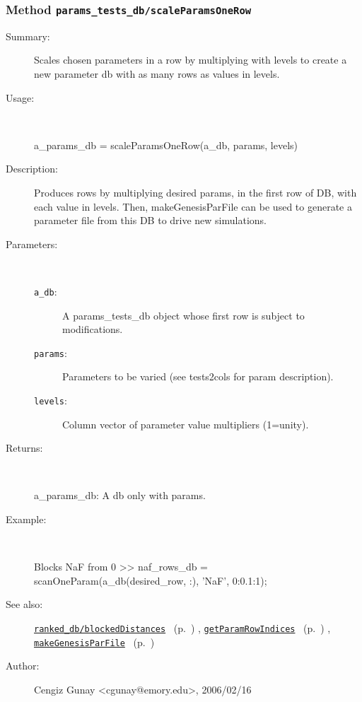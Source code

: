 \subsubsection[Method \texttt{scaleParamsOneRow}]{Method \texttt{params\_tests\_db/scaleParamsOneRow}}%
%
\label{ref_params_tests_db__scaleParamsOneRow}%
\hypertarget{ref_params_tests_db__scaleParamsOneRow}{}%
\begin{description}
\item[Summary:]Scales chosen parameters in a row by multiplying with levels to create a new parameter db with as many rows as values in levels.
%
\item[Usage:]~%
\begin{lyxcode}%
a\_params\_db = scaleParamsOneRow(a\_db, params, levels)
%
\end{lyxcode}%
%
\item[Description:]%
Produces rows by multiplying desired params, in the first row of DB, 
 with each value in levels. Then, makeGenesisParFile can be used to generate
 a parameter file from this DB to drive new simulations.
\item[Parameters:]~
\begin{description}%
\item[\texttt{a\_db}:]
 A params\_tests\_db object whose first row is subject to modifications.
\item[\texttt{params}:]
 Parameters to be varied (see tests2cols for param description).
\item[\texttt{levels}:]
 Column vector of parameter value multipliers (1=unity).
\end{description}%
%
\item[Returns:]~

	a\_params\_db: A db only with params.
%
\item[Example:]~
\begin{lyxcode} Blocks NaF from 0%
 >> naf\_rows\_db = scanOneParam(a\_db(desired\_row, :), 'NaF', 0:0.1:1);\\%
\end{lyxcode}
%
\item[See also:]%
\hyperlink{ref_ranked_db__blockedDistances}{\texttt{ranked\_db/blockedDistances}}%
\ (p.~\pageref{ref_ranked_db__blockedDistances})%
%
, \hyperlink{ref_getParamRowIndices}{\texttt{getParamRowIndices}}%
\ (p.~\pageref{ref_getParamRowIndices})%
%
, \hyperlink{ref_makeGenesisParFile}{\texttt{makeGenesisParFile}}%
\ (p.~\pageref{ref_makeGenesisParFile})%
%
%
\item[Author:]%
Cengiz Gunay <cgunay@emory.edu>, 2006/02/16%
\end{description}
\methodline%
